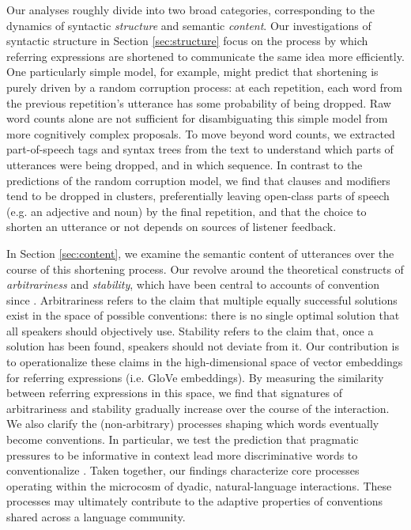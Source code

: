 \documentclass[alpha-refs]{wiley-article}
\newcommand{\ndg}[1]{\textcolor{green}{[ndg: #1]}}
\begin{document}
Our analyses roughly divide into two broad categories, corresponding to the dynamics of syntactic \emph{structure} and semantic \emph{content}.
Our investigations of syntactic structure in Section \ref{sec:structure} focus on the process by which referring expressions are shortened to communicate the same idea more efficiently.
One particularly simple model, for example, might predict that shortening is purely driven by a random corruption process: at each repetition, each word from the previous repetition's utterance has some probability of being dropped.
Raw word counts alone are not sufficient for disambiguating this simple model from more cognitively complex proposals.
To move beyond word counts, we extracted part-of-speech tags and syntax trees from the text to understand which parts of utterances were being dropped, and in which sequence.
In contrast to the predictions of the random corruption model, we find that clauses and modifiers tend to be dropped in clusters, preferentially leaving open-class parts of speech (e.g. an adjective and noun) by the final repetition, and that the choice to shorten an utterance or not depends on sources of listener feedback.  %

In Section \ref{sec:content}, we examine the semantic content of utterances over the course of this shortening process.
Our revolve around the theoretical constructs of \emph{arbitrariness} and \emph{stability}, which have been central to accounts of convention since \cite{Lewis69_Convention}.
Arbitrariness refers to the claim that multiple equally successful solutions exist in the space of possible conventions: there is no single optimal solution that all speakers should objectively use.
Stability refers to the claim that, once a solution has been found, speakers should not deviate from it.
Our contribution is to operationalize these claims in the high-dimensional space of vector embeddings for referring expressions (i.e. GloVe embeddings).
By measuring the similarity between referring expressions in this space, we find that signatures of arbitrariness and stability gradually increase over the course of the interaction.
We also clarify the (non-arbitrary) processes shaping which words eventually become conventions.
In particular, we test the prediction that pragmatic pressures to be informative in context lead more discriminative words to conventionalize \citep{KirbyTamarizCornishSmith15_CompressionCommunication,GibsonEtAl17_ColorNamingUse}.
Taken together, our findings characterize core processes operating within the microcosm of dyadic, natural-language interactions. These processes may ultimately contribute to the adaptive properties of conventions shared across a language community.
\end{document}
